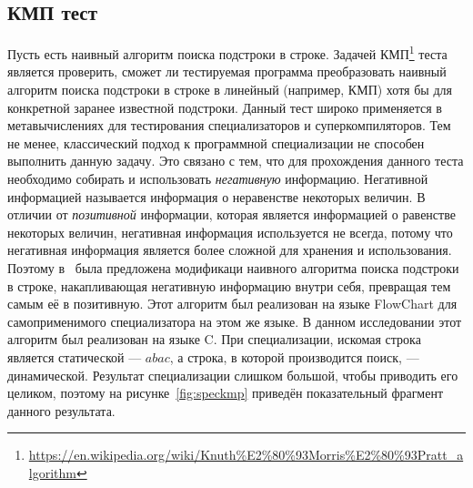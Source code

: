 \subsection{КМП тест}
Пусть есть наивный алгоритм поиска подстроки в строке.
Задачей КМП\footnote{\url{https://en.wikipedia.org/wiki/Knuth\%E2\%80\%93Morris\%E2\%80\%93Pratt\_algorithm}} теста является проверить,
сможет ли тестируемая программа преобразовать наивный алгоритм поиска подстроки в строке в линейный (например, КМП) хотя бы
для конкретной заранее известной подстроки.
Данный тест широко применяется в метавычислениях для тестирования специализаторов и суперкомпиляторов.
Тем не менее, классический подход к программной специализации не способен выполнить данную задачу.
Это связано с тем, что для прохождения данного теста необходимо собирать и использовать \emph{негативную} информацию.
Негативной информацией называется информация о неравенстве некоторых величин.
В отличии от \emph{позитивной} информации, которая является информацией о равенстве некоторых величин,
негативная информация используется не всегда, потому что негативная информация является более сложной для
хранения и использования.
Поэтому в~\cite{PEAPG} была предложена модификаци наивного алгоритма поиска подстроки в строке,
накапливающая негативную информацию внутри себя, превращая тем самым её в позитивную.
Этот алгоритм был реализован на языке \textsf{FlowChart} для самоприменимого специализатора на этом же языке. В данном исследовании этот алгоритм был реализован на языке \textsf{C}.  При специализации, искомая строка является статической --- $abac$, а строка, в которой производится поиск, --- динамической. Результат специализации слишком большой, чтобы приводить его целиком, поэтому на рисунке~\ref{fig:speckmp} приведён показательный фрагмент данного результата. 

